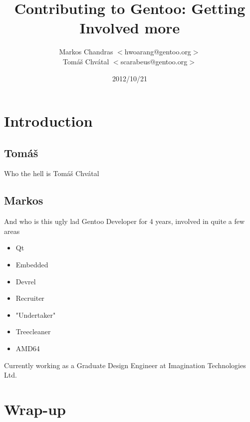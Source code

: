 \documentclass{beamer}
\title{Contributing to Gentoo: Getting Involved more}
\author[Markos Chandras \& Tomáš Chvátal]{Markos Chandras $<$hwoarang@gentoo.org$>$ \\ Tomáš Chvátal $<$scarabeus@gentoo.org$>$}
\date{2012/10/21}
\begin{document}
\frame{\titlepage}
\section{Introduction}

\subsection{Tomáš}
\begin{frame}{Who the hell is Tomáš Chvátal}
\end{frame}

\subsection{Markos}
\begin{frame}{And who is this ugly lad}
Gentoo Developer for 4 years, involved in quite a few areas
\begin{itemize}
	\item Qt
	\item Embedded
	\item Devrel
	\item Recruiter
	\item "Undertaker"
	\item Treecleaner
	\item AMD64
\end{itemize}
Currently working as a Graduate Design Engineer at Imagination Technologies Ltd.
\end{frame}

%

\section{Wrap-up}
\end{document}
